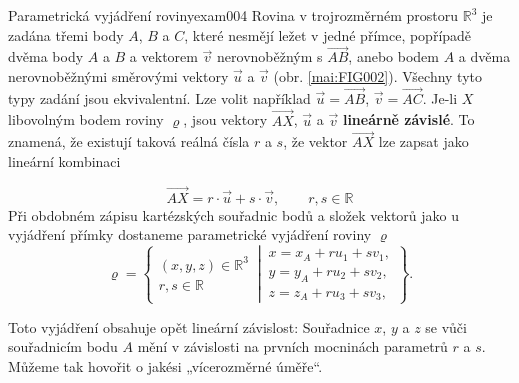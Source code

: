 \begin{mathexam}{Parametrická vyjádření roviny}{exam004}
  Rovina v trojrozměrném prostoru \(\mathbb{R}^3\) je zadána třemi body \(A\), \(B\) a \(C\), které
  nesmějí ležet v jedné přímce, popřípadě dvěma body \(A\) a \(B\) a vektorem \(\vec{v}\)
  nerovnoběžným s \(\overrightarrow{AB}\), anebo bodem \(A\) a dvěma nerovnoběžnými směrovými
  vektory \(\vec{u}\) a \(\vec{v}\) (obr. \ref{mai:FIG002}). Všechny tyto typy zadání jsou
  ekvivalentní. Lze volit například \(\vec{u} = \overrightarrow{AB}\), \(\vec{v} =
  \overrightarrow{AC}\). Je-li \(X\) libovolným bodem roviny \(\varrho\), jsou vektory
  \(\overrightarrow{AX}\), \(\vec{u}\) a \(\vec{v}\) \textbf{lineárně závislé}. To znamená, že
  existují taková reálná čísla \(r\) a \(s\), že vektor \(\overrightarrow{AX}\) lze zapsat jako
  lineární kombinaci

  \begin{equation*}
    \overrightarrow{AX} = r\cdot\vec{u} + s\cdot\vec{v}, \qquad r,s \in\mathbb{R}
  \end{equation*}
  Při obdobném zápisu kartézských souřadnic bodů a složek vektorů jako u vyjádření přímky dostaneme
  parametrické vyjádření roviny \(\varrho\)
  \begin{equation*}
    \varrho = \left\{
    \begin{matrix}  
      (x,y,z)\in\mathbb{R}^3  \\
      r, s \in\mathbb{R}
    \end{matrix}
    \,\left\lvert\,
    \begin{matrix}
      x = x_A + ru_1 + sv_1,        \\
      y = y_A + ru_2 + sv_2,        \\
      z = z_A + ru_3 + sv_3,
    \end{matrix}\right.          
    \right\}.
  \end{equation*} 

  { \centering
    \captionsetup{type=figure}
     \par}

  Toto vyjádření obsahuje opět lineární závislost: Souřadnice \(x\), \(y\) a \(z\) se vůči
  souřadnicím bodu \(A\) mění v závislosti na prvních mocninách parametrů \(r\) a \(s\). Můžeme tak
  hovořit o jakési „vícerozměrné úměře“.
\end{mathexam}
  
